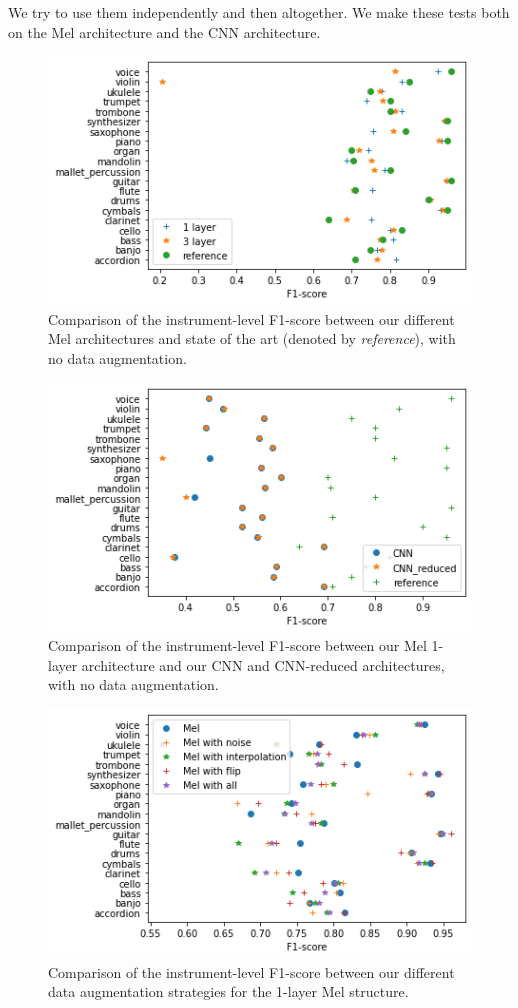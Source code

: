 \documentclass[final]{cvpr}
\begin{document}
We try to use them independently and then altogether. We make these tests both on the Mel architecture and the CNN architecture.
\begin{figure}
	\centering
	\includegraphics[scale = 0.5]{to_ref.png}
	\caption{Comparison of the instrument-level F1-score between our different Mel architectures and state of the art (denoted by \textit{reference}), with no data augmentation.}
	\label{to_ref}
\end{figure}
\begin{figure}
	\centering
	\includegraphics[scale = 0.5]{cnn_plot.png}
	\caption{Comparison of the instrument-level F1-score between our Mel 1-layer architecture and our CNN and CNN-reduced architectures, with no data augmentation.}
	\label{cnn_plot}
\end{figure}
\begin{figure}
	\centering
	\includegraphics[scale = 0.5]{mel_data.png}
	\caption{Comparison of the instrument-level F1-score between our different data augmentation strategies for the 1-layer Mel structure.}
	\label{mel_data}
\end{figure}
\end{document}
